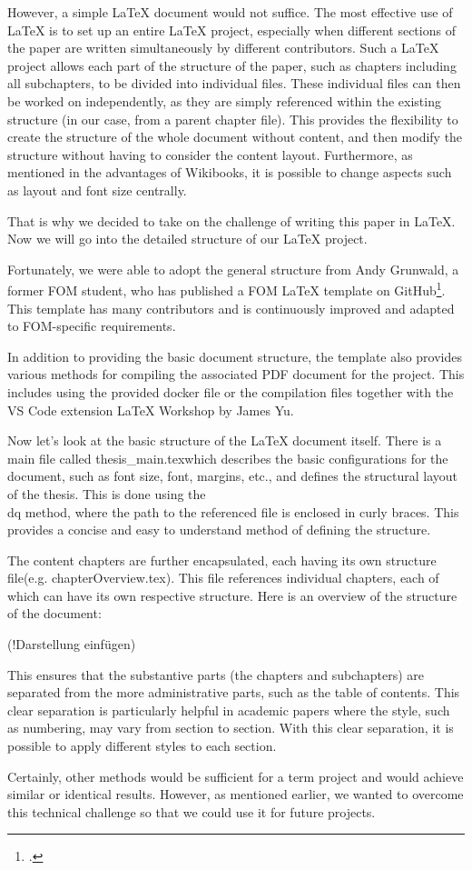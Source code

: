 However, a simple \LaTeX{} document would not suffice. The most effective use of \LaTeX{} is to set up an entire \LaTeX{} project, especially when different sections of the paper are written simultaneously by different contributors. Such a \LaTeX{} project allows each part of the structure of the paper, such as chapters including all subchapters, to be divided into individual files. These individual files can then be worked on independently, as they are simply referenced within the existing structure (in our case, from a parent chapter file). This provides the flexibility to create the structure of the whole document without content, and then modify the structure without having to consider the content layout. Furthermore, as mentioned in the advantages of Wikibooks, it is possible to change aspects such as layout and font size centrally.

That is why we decided to take on the challenge of writing this paper in \LaTeX{}. Now we will go into the detailed structure of our \LaTeX{} project.

Fortunately, we were able to adopt the general structure from Andy Grunwald, a former FOM student, who has published a \dq FOM \LaTeX{} template \dq  on GitHub\footcite{grundwald_andygrunwaldfom-latex-template_nodate}. This template has many contributors and is continuously improved and adapted to FOM-specific requirements.

In addition to providing the basic document structure, the template also provides various methods for compiling the associated PDF document for the project. This includes using the provided docker file or the compilation files together with the VS Code extension \dq \LaTeX{} Workshop \dq  by James Yu.

Now let's look at the basic structure of the \LaTeX{} document itself. There is a main file called \dq thesis\_main.tex\dq  which describes the basic configurations for the document, such as font size, font, margins, etc., and defines the structural layout of the thesis. This is done using the \dq \\dq  method, where the path to the referenced file is enclosed in curly braces. This provides a concise and easy to understand method of defining the structure.

The content chapters are further encapsulated, each having its own \dq structure file\dq  (e.g. chapterOverview.tex). This file references individual chapters, each of which can have its own respective structure. Here is an overview of the structure of the document:

(!Darstellung einfügen)

This ensures that the substantive parts (the chapters and subchapters) are separated from the more administrative parts, such as the table of contents. This clear separation is particularly helpful in academic papers where the style, such as numbering, may vary from section to section. With this clear separation, it is possible to apply different styles to each section.

Certainly, other methods would be sufficient for a term project and would achieve similar or identical results. However, as mentioned earlier, we wanted to overcome this technical challenge so that we could use it for future projects.